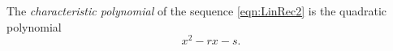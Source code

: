 

\setcounter{section}{1}
\setcounter{subsection}{2}
\setcounter{dfn}{3}

\begin{dfn}
The \emph{characteristic polynomial} of the sequence \eqref{eqn:LinRec2} is the quadratic polynomial
\[
x^2 - rx - s.
\]
\end{dfn}

